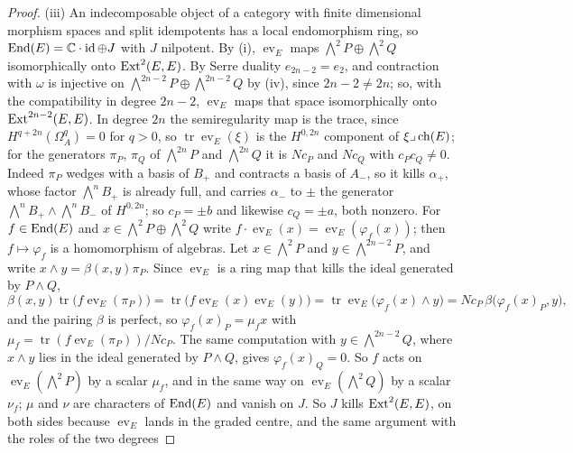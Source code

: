 \begin{proof}
(iii) An indecomposable object of a category with finite dimensional
morphism spaces and split idempotents has a local endomorphism ring, so
$\operatorname{End}(E)=\mathbb{C}\cdot\operatorname{id}\oplus J$ with $J$ nilpotent. By
(i), $\operatorname{ev}_{E}$ maps
$\bigwedge^{2}P\oplus\bigwedge^{2}Q$ isomorphically onto $\operatorname{Ext}^{2}(E,E)$.
By Serre duality $e_{2n-2}=e_{2}$, and contraction with $\omega$ is injective
on $\bigwedge^{2n-2}P\oplus\bigwedge^{2n-2}Q$ by (iv),
since $2n-2\ne2n$; so, with the compatibility in
degree $2n-2$, $\operatorname{ev}_{E}$ maps that space isomorphically onto
$\operatorname{Ext}^{2n-2}(E,E)$. In degree $2n$ the semiregularity map is the trace, since
$H^{q+2n}(\Omega^{q}_{A})=0$ for $q>0$, so
$\operatorname{tr}\operatorname{ev}_{E}(\xi)$ is the $H^{0,2n}$ component of
$\xi\lrcorner\operatorname{ch}(E)$; for the generators $\pi_{P}$, $\pi_{Q}$ of
$\bigwedge^{2n}P$ and $\bigwedge^{2n}Q$ it is $Nc_{P}$ and $Nc_{Q}$ with
$c_{P}c_{Q}\ne0$. Indeed $\pi_{P}$ wedges with a basis of $B_{+}$ and contracts
a basis of $A_{-}$, so it kills $\alpha_{+}$, whose factor $\bigwedge^{n}B_{+}$
is already full, and carries $\alpha_{-}$ to $\pm$ the generator
$\bigwedge^{n}B_{+}\wedge\bigwedge^{n}B_{-}$ of $H^{0,2n}$; so $c_{P}=\pm b$
and likewise $c_{Q}=\pm a$, both nonzero. For $f\in\operatorname{End}(E)$ and
$x\in\bigwedge^{2}P\oplus\bigwedge^{2}Q$ write
$f\cdot\operatorname{ev}_{E}(x)=\operatorname{ev}_{E}(\varphi_{f}(x))$; then
$f\mapsto\varphi_{f}$ is a homomorphism of algebras. Let $x\in\bigwedge^{2}P$
and $y\in\bigwedge^{2n-2}P$, and write $x\wedge y=\beta(x,y)\pi_{P}$. Since
$\operatorname{ev}_{E}$ is a ring map that kills the ideal generated by
$P\wedge Q$,
\[
  \beta(x,y)\operatorname{tr}\bigl(f\operatorname{ev}_{E}(\pi_{P})\bigr)
  =\operatorname{tr}\bigl(f\operatorname{ev}_{E}(x)\operatorname{ev}_{E}(y)\bigr)
  =\operatorname{tr}\operatorname{ev}_{E}\bigl(\varphi_{f}(x)\wedge y\bigr)
  =Nc_{P}\,\beta\bigl(\varphi_{f}(x)_{P},y\bigr),
\]
and the pairing $\beta$ is perfect, so $\varphi_{f}(x)_{P}=\mu_{f}x$ with
$\mu_{f}=\operatorname{tr}(f\operatorname{ev}_{E}(\pi_{P}))/Nc_{P}$. The same
computation with $y\in\bigwedge^{2n-2}Q$, where $x\wedge y$ lies in the ideal
generated by $P\wedge Q$, gives $\varphi_{f}(x)_{Q}=0$. So $f$ acts on
$\operatorname{ev}_{E}(\bigwedge^{2}P)$ by a scalar $\mu_{f}$, and in the same
way on $\operatorname{ev}_{E}(\bigwedge^{2}Q)$ by a scalar $\nu_{f}$; $\mu$ and
$\nu$ are characters of $\operatorname{End}(E)$ and vanish on $J$. So $J$ kills
$\operatorname{Ext}^{2}(E,E)$, on both sides because $\operatorname{ev}_{E}$ lands in the
graded centre, and the same argument with the roles of the two degrees

\end{proof}
